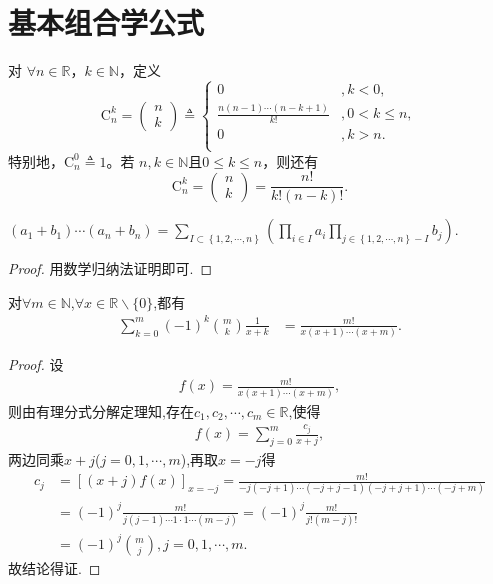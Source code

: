 \documentclass[../../main.tex]{subfiles}
\begin{document}
\section{基本组合学公式}

\begin{definition}[组合数定义的扩充]\label{definition:组合数定义的扩充}
对 \( \forall n \in \mathbb{R} \)，\( k \in \mathbb{N} \)，定义
\[
\mathrm{C}_{n}^{k} = \begin{pmatrix} n \\ k \end{pmatrix} \triangleq \begin{cases}
0&,k<0,\\
\frac{n(n - 1) \cdots (n - k + 1)}{k!}&,0< k\leqslant n ,\\
0&,k>n.\\
\end{cases}
\]
特别地，\( \mathrm{C}_{n}^{0} \triangleq 1 \)。若 \( n, k \in \mathbb{N} \)且$0\leqslant k\leqslant n$，则还有
\[
\mathrm{C}_{n}^{k} = \begin{pmatrix} n \\ k \end{pmatrix} = \frac{n!}{k! (n - k)!}.
\]
\end{definition}

\begin{theorem}[二项式定理的推广]\label{theorem:二项式定理的推广}
$\left( a_1+b_1 \right)\cdots \left( a_n+b_n \right) =\sum_{I\subset \left\{ 1,2,\cdots ,n \right\}}{\left( \prod_{i\in I}{a_i}\prod_{j\in \left\{ 1,2,\cdots ,n \right\} -I}{b_j} \right)}.$
\end{theorem}
\begin{proof}
用数学归纳法证明即可.
\end{proof}

\begin{proposition}\label{proposition:组合数相关常用恒等式}
对$\forall m\in \mathbb{N}$,$\forall x\in \mathbb{R} \backslash \{0\}$,都有
\begin{align*}
\sum_{k=0}^m{(-1) ^k\binom{m}{k}\frac{1}{x+k}}&=\frac{m!}{x(x+1)\cdots(x+m)}.
\end{align*}
\end{proposition}
\begin{proof}
设
\begin{align*}
f(x)=\frac{m!}{x(x+1)\cdots(x+m)},
\end{align*}
则由有理分式分解定理知,存在$c_1,c_2,\cdots ,c_m\in \mathbb{R}$,使得
\begin{align*}
f(x)=\sum_{j=0}^m{\frac{c_j}{x+j}},
\end{align*}
两边同乘$x+j$($j=0,1,\cdots ,m$),再取$x=-j$得
\begin{align*}
c_j&=\left[ (x+j) f(x) \right] _{x=-j}=\frac{m!}{-j(-j+1)\cdots(-j+j-1)(-j+j+1)\cdots(-j+m)}
\\
&=(-1) ^j\frac{m!}{j(j-1)\cdots 1\cdot 1\cdots(m-j)}=(-1) ^j\frac{m!}{j!(m-j)!}
\\
&=(-1) ^j\binom{m}{j},j=0,1,\cdots ,m.
\end{align*}
故结论得证.
\end{proof}
\end{document}
